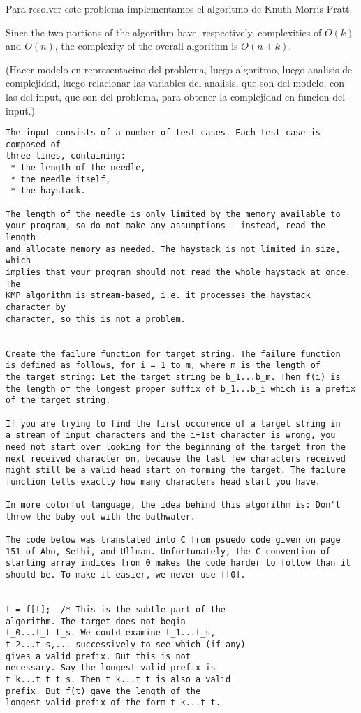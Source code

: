 Para resolver este problema implementamos el algoritmo de Knuth-Morris-Pratt.

Since the two portions of the algorithm have, respectively, complexities of
$O(k)$ and $O(n)$, the complexity of the overall algorithm is $O(n+k)$.

(Hacer modelo en representacino del problema, luego algoritmo, luego analisis de
complejidad, luego relacionar las variables del analisis, que son del modelo,
con las del input, que son del problema, para obtener la complejidad en funcion
del input.)

\begin{verbatim}
The input consists of a number of test cases. Each test case is composed of
three lines, containing:
 * the length of the needle,
 * the needle itself,
 * the haystack.

The length of the needle is only limited by the memory available to
your program, so do not make any assumptions - instead, read the length
and allocate memory as needed. The haystack is not limited in size, which
implies that your program should not read the whole haystack at once. The
KMP algorithm is stream-based, i.e. it processes the haystack character by
character, so this is not a problem.


Create the failure function for target string. The failure function
is defined as follows, for i = 1 to m, where m is the length of
the target string: Let the target string be b_1...b_m. Then f(i) is
the length of the longest proper suffix of b_1...b_i which is a prefix
of the target string.

If you are trying to find the first occurence of a target string in
a stream of input characters and the i+1st character is wrong, you
need not start over looking for the beginning of the target from the
next received character on, because the last few characters received
might still be a valid head start on forming the target. The failure
function tells exactly how many characters head start you have.

In more colorful language, the idea behind this algorithm is: Don't
throw the baby out with the bathwater.

The code below was translated into C from psuedo code given on page
151 of Aho, Sethi, and Ullman. Unfortunately, the C-convention of
starting array indices from 0 makes the code harder to follow than it
should be. To make it easier, we never use f[0].


t = f[t];  /* This is the subtle part of the
algorithm. The target does not begin
t_0...t_t t_s. We could examine t_1...t_s,
t_2...t_s,... successively to see which (if any)
gives a valid prefix. But this is not
necessary. Say the longest valid prefix is
t_k...t_t t_s. Then t_k...t_t is also a valid
prefix. But f(t) gave the length of the
longest valid prefix of the form t_k...t_t.


\end{verbatim}

